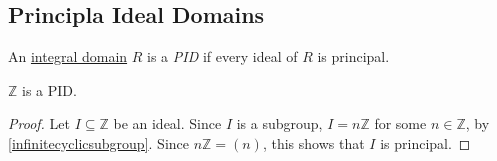 \subsection{Principla Ideal Domains}\label{principalidealdomains}
An \hyperref[integraldomain]{integral domain} $R$ is a \emph{PID} if every ideal of $R$ is principal.

\begin{proposition}
$\mathbb{Z}$ is a PID.
\end{proposition}

\begin{proof}
Let $I \subseteq \mathbb{Z}$ be an ideal. Since $I$ is a subgroup, $I = n\mathbb{Z}$ for some $n \in \mathbb{Z}$, by
\ref{infinitecyclicsubgroup}. Since $n\mathbb{Z} = (n)$, this shows that $I$ is principal.
\end{proof}